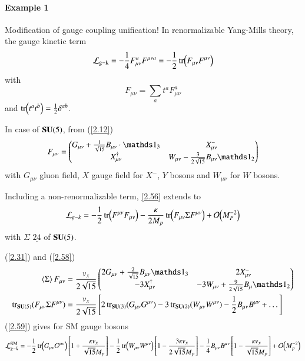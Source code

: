 \paragraph{Example 1} Modification of gauge coupling unification! In renormalizable Yang-Mills theory, the gauge kinetic term
\begin{equation}
   \mathcal{L}_{\text{g}-\text{k}} = - \frac{1}{4} F^a_{\mu\nu} F^{\mu \nu a} = - \frac{1}{2} \tr (F_{\mu\nu}F^{\mu\nu})  \label{2.56}
\end{equation}
with 
\begin{equation}
   F_{\mu\nu} = \sum_{a} t^a F^a_{\mu\nu}  \label{2.57}
\end{equation}
and $\tr(t^a t^b) = \frac{1}{2} \delta^{ab} $.

In case of $\mathbf{SU}(5)$, from (\ref{2.12})
\begin{equation}
   F_{\mu\nu} = \begin{pmatrix} G_{\mu\nu} + \frac{1}{\sqrt{15}} B_{\mu\nu} \cdot \id_{3} & X^-_{\mu\nu} \\ X^\dagger_{\mu\nu} & W_{\mu\nu} - \frac{3}{2\sqrt{15}}B_{\mu\nu} \id_2  \end{pmatrix} \label{2.58}
\end{equation}
with $G_{\mu\nu}$ gluon field, $X$ gauge field for $X^-$, $Y$ bosons and $W_{\mu\nu}$ for $W$ bosons.


Including a non-renormalizable term, \eqref{2.56} extends to 
\begin{equation}
   \lag_{g-k} = -\frac{1}{2} \tr(F^{\mu\nu}F_{\mu\nu}) - \frac{\kappa}{2M_p} \tr(F_{\mu\nu} \Sigma F^{\mu\nu}) + \order{M_P^{-2}} \label{2.59}
\end{equation}
with $\Sigma$ $\underline{24}$ of $\mathbf{SU}(5)$.

(\ref{2.31}) and (\ref{2.58})
\begin{align*}
   \expval{\Sigma} F_{\mu\nu} &= \frac{v_x}{2\sqrt{15}} \begin{pmatrix} 2 G_{\mu\nu} + \frac{2}{\sqrt{15}}B_{\mu\nu} \id_3 & 2X^-_{\mu\nu} \\ -3X^\dagger_{\mu\nu} & -3 W_{\mu\nu} + \frac{9}{2\sqrt{15}}B_\mu \id_2 \end{pmatrix} \\
   \tr_{\SU(5)}(F_{\mu\nu} \Sigma F^{\mu\nu}) &= \frac{v_x}{2\sqrt{15}} \left[ 2 \tr_{\SU(3)} (G_{\mu\nu}G^{\mu\nu}) - 3 \tr_{\SU(2)} (W_{\mu\nu}W^{\mu\nu}) - \frac{1}{2} B_{\mu\nu} B^{\mu\nu} + \dots  \right]
\end{align*}
(\ref{2.59}) gives for SM gauge bosons
\begin{equation}
   \lag^\text{SM}_{g-k} = -\frac{1}{2} \tr(G_{\mu\nu}G^{\mu\nu}) \left[ 1 + \frac{\kappa v_x}{\sqrt{15} M_p} \right] - \frac{1}{2} \tr(W_{\mu\nu}W^{\mu\nu}) \left[ 1 - \frac{3\kappa v_x}{2\sqrt{15}M_p} \right] - \frac{1}{4} B_{\mu\nu} B^{\mu\nu} \left[ 1 - \frac{\kappa v_x}{\sqrt{15} M_p} \right] + \order{M_p^{-2}} \label{2.60}
\end{equation}

